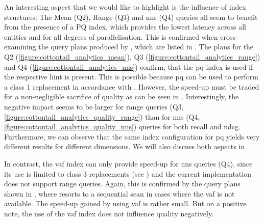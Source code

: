 An interesting aspect that we would like to highlight is the influence of index structures: The Mean (Q2), Range (Q3) and \acrshort{nns} (Q4) queries all seem to benefit from the presence of a PQ index, which provides the lowest latency across all entities and for all degrees of parallelisation. This is confirmed when cross-examining the query plans produced by \cottontail{}, which are listed in . The plans for the Q2 (\ref{figure:cottontail_analytics_mean}), Q3 (\ref{figure:cottontail_analytics_range}) and Q4 (\ref{figure:cottontail_analytics_nns}) confirm, that the \acrshort{pq} index is used if the respective hint is present. This is possible because \acrshort{pq} can be used to perform a class 1 replacement in accordance with . However, the speed-up must be traded for a non-negligible sacrifice of quality as can be seen in . Interestingly, the negative impact seems to be larger for range queries (Q3, \ref{figure:cottontail_analytics_quality_range}) than for \acrshort{nns} (Q4, \ref{figure:cottontail_analytics_quality_nns}) queries for both recall and n\acrshort{dcg}. Furthermore, we can observe that the same index configuration for \acrshort{pq} yields very different results for different dimensions. We will also discuss both aspects in .

In contrast, the \acrshort{vaf} index can only provide speed-up for \acrshort{nns} queries (Q4), since its use is limited to class 3 replacements (see ) and the current implementation does not support range queries. Again, this is confirmed by the query plans shown in , where \cottontail{} resorts to a sequential scan in cases where the \acrshort{vaf} is not available. The speed-up gained by using \acrshort{vaf} is rather small. But on a positive note, the use of the \acrshort{vaf} index does not influence quality negatively.

